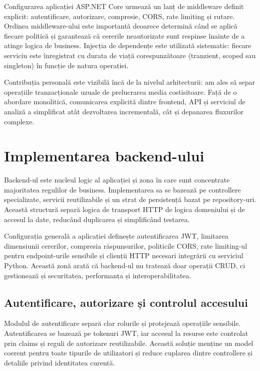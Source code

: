 Configurarea aplicației ASP.NET Core urmează un lanț de middleware definit explicit: autentificare, autorizare, compresie, CORS, rate limiting și rutare. Ordinea middleware-ului este importantă deoarece determină când se aplică fiecare politică și garantează că cererile neautorizate sunt respinse înainte de a atinge logica de business. Injecția de dependențe este utilizată sistematic: fiecare serviciu este înregistrat cu durata de viață corespunzătoare (tranzient, scoped sau singleton) în funcție de natura operației.

Contribuția personală este vizibilă încă de la nivelul arhitecturii: am ales să separ operațiile tranzacționale uzuale de prelucrarea media costisitoare. Față de o abordare monolitică, comunicarea explicită dintre frontend, API și serviciul de analiză a simplificat atât dezvoltarea incrementală, cât și depanarea fluxurilor complexe.

\section{Implementarea backend-ului}

Backend-ul este nucleul logic al aplicației și zona în care sunt concentrate majoritatea regulilor de business. Implementarea sa se bazează pe controllere specializate, servicii reutilizabile și un strat de persistență bazat pe repository-uri. Această structură separă logica de transport HTTP de logica domeniului și de accesul la date, reducând duplicarea și simplificând testarea.

Configurația generală a aplicației definește autentificarea JWT, limitarea dimensiunii cererilor, compresia răspunsurilor, politicile CORS, rate limiting-ul pentru endpoint-urile sensibile și clienții HTTP necesari integrării cu serviciul Python. Această zonă arată că backend-ul nu tratează doar operații CRUD, ci gestionează și securitatea, performanța și interoperabilitatea.

\subsection{Autentificare, autorizare și controlul accesului}

Modulul de autentificare separă clar rolurile și protejează operațiile sensibile. Autentificarea se bazează pe tokenuri JWT, iar accesul la resurse este controlat prin claims și reguli de autorizare reutilizabile. Această soluție menține un model coerent pentru toate tipurile de utilizatori și reduce cuplarea dintre controllere și detaliile privind identitatea curentă.

